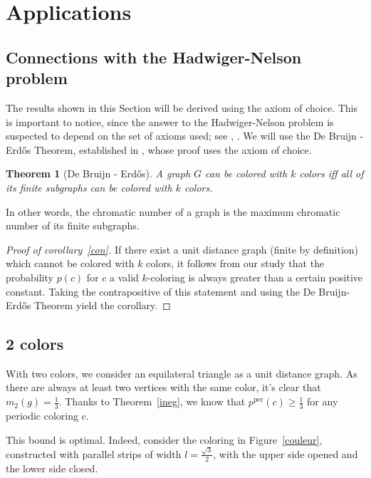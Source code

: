 \documentclass[a4paper,11pt]{article}
\newtheorem{theo}{Theorem}
\theoremstyle{definition}
\theoremstyle{remark}
\newcommand{\pper}{p^{\mathrm{per}}}
\begin{document}
\section{Applications} \label{appli}
\subsection{Connections with the Hadwiger-Nelson problem} \label{hn}
The results shown in this Section will be derived using the axiom of choice. 
This is important to notice, since the answer to the Hadwiger-Nelson problem is 
suspected to depend on the set of axioms used; see \cite{choice}, \cite{choice2}. We will use the 
De Bruijn - Erd\H{o}s Theorem, established in \cite{erdos}, whose proof uses 
the axiom of choice.
\begin{theo}[De Bruijn - Erd\H{o}s]
 A graph $G$ can be colored with $k$ colors iff all of its finite subgraphs 
 can be colored with $k$ colors.
\end{theo}
In other words, the chromatic number of a graph is the maximum chromatic number 
of its finite subgraphs.

\begin{proof}[Proof of corollary~\ref{con}]If there exist a unit distance graph (finite by definition) which cannot 
be colored with $k$ colors, it 
follows from our study that the probability $p(c)$ for $c$ a valid 
$k$-coloring is always greater than a certain positive constant. Taking the 
contrapositive of this statement and using the De Bruijn-Erd\H{o}s Theorem yield 
the corollary.
\end{proof}

\subsection{2 colors} \label{2col}

With two colors, we consider an equilateral triangle as a unit distance graph. 
As there are always at least two vertices with the same color, it's clear that 
$m_2(g) = \frac{1}{3}$. Thanks to Theorem~\ref{ineg}, 
we know that $\pper(c) \geq \frac13$ for any periodic coloring $c$.

This bound is optimal. Indeed, consider the coloring in Figure~\ref{couleur}, 
constructed with parallel strips of width 
$l = \frac {\sqrt3}{2}$, with the upper side opened and the lower side closed. 
\end{document}
